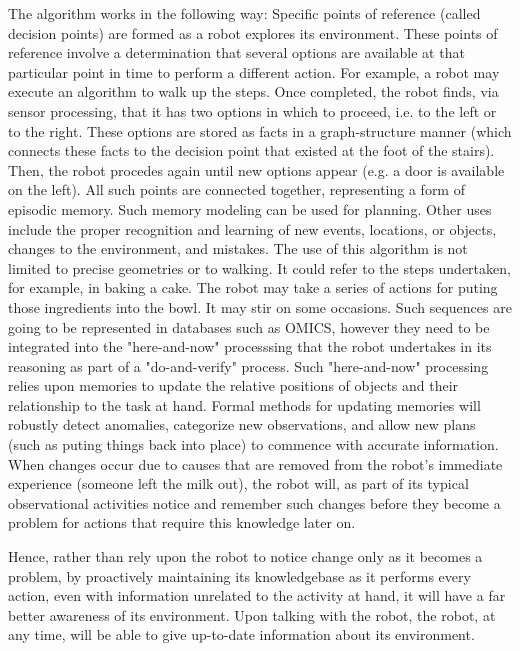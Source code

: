 \documentclass[12pt]{amsart}
\begin{document}
The algorithm works in the following way:
Specific points of reference (called decision points) are formed as a
robot explores its environment.  These points of reference involve a
determination that several options are available at that particular point
in time to perform a different action.  For example, a robot may execute
an algorithm to walk up the steps.  Once completed, the robot finds, via
sensor processing, that it has two options in which to proceed, i.e. to
the left or to the right.  These options are stored as facts in a
graph-structure manner (which connects these facts to the decision point
that existed at the foot of the stairs).  Then, the robot procedes again
until new options appear (e.g. a door is available on the left).  All
such points are connected together, representing a form of episodic
memory.  Such memory modeling can be used for planning.
Other uses include the proper recognition and learning of new events,
locations, or objects, changes to the environment, and mistakes. The use
of this algorithm is not limited to precise geometries or to walking.  It
could refer to the steps undertaken, for example, in baking a cake.  The
robot may take a series of actions for puting those ingredients into the
bowl.  It may stir on some occasions.
Such sequences are going to be represented in databases such as OMICS,
however they need to be integrated into the "here-and-now" processsing
that the robot undertakes in its reasoning as part of a "do-and-verify"
process.  Such "here-and-now" processing relies upon memories to update
the relative positions of objects and their relationship to the task at
hand. Formal methods for updating memories will robustly detect
anomalies, categorize new observations, and allow new plans (such as
puting things back into place) to commence with accurate information. 
When changes occur due to causes that are removed from the robot's
immediate experience (someone left the milk out), the robot will, as part
of its typical observational activities notice and remember such changes
before they become a problem for actions that require this knowledge
later on. 
 
Hence, rather than rely upon the robot to notice change only as it
becomes a problem, by proactively maintaining its knowledgebase as it
performs every action, even with information unrelated to the activity at
hand, it will have a far better awareness of its environment.  Upon
talking with the robot, the robot, at any time, will be able to give
up-to-date information about its environment.
\end{document}
